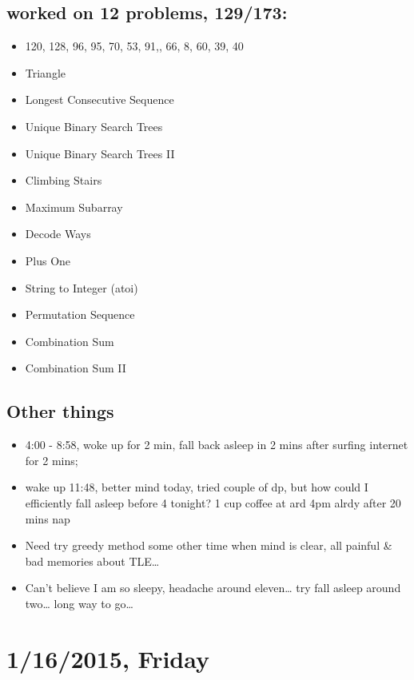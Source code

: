 \documentclass[9pt,b5paper]{article}
\begin{document}
\subsection{worked on 12 problems, 129/173:}
\label{sec-9-1}
\begin{itemize}
\item 120, 128, 96, 95, 70, 53, 91,, 66, 8, 60, 39, 40
\item Triangle
\item Longest Consecutive Sequence
\item Unique Binary Search Trees
\item Unique Binary Search Trees II
\item Climbing Stairs
\item Maximum Subarray
\item Decode Ways
\item Plus One
\item String to Integer (atoi)
\item Permutation Sequence
\item Combination Sum
\item Combination Sum II
\end{itemize}
\subsection{Other things}
\label{sec-9-2}
\begin{itemize}
\item 4:00 - 8:58, woke up for 2 min, fall back asleep in 2 mins after surfing internet for 2 mins;
\item wake up 11:48, better mind today, tried couple of dp, but how could I efficiently fall asleep before 4 tonight? 1 cup coffee at ard 4pm alrdy after 20 mins nap
\item Need try greedy method some other time when mind is clear, all painful \& bad memories about TLE\ldots{}
\item Can't believe I am so sleepy, headache around eleven\ldots{} try fall asleep around two\ldots{} long way to go\ldots{}
\end{itemize}
\section{1/16/2015, Friday}
\label{sec-10}
\end{document}

